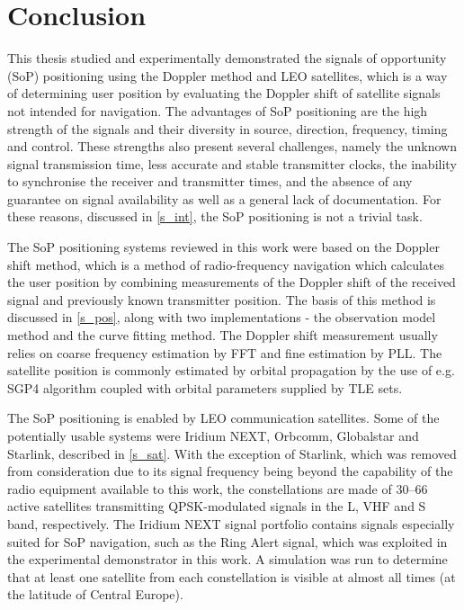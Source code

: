 \chapter{Conclusion}
\label{s_con}

This thesis studied and experimentally demonstrated the signals of opportunity (SoP) positioning using the Doppler method and LEO satellites, which is a way of determining user position by evaluating the Doppler shift of satellite signals not intended for navigation. The advantages of SoP positioning are the high strength of the signals and their diversity in source, direction, frequency, timing and control. These strengths also present several challenges, namely the unknown signal transmission time, less accurate and stable transmitter clocks, the inability to synchronise the receiver and transmitter times, and the absence of any guarantee on signal availability as well as a general lack of documentation. For these reasons, discussed in \autoref{s_int}, the SoP positioning is not a trivial task.

The SoP positioning systems reviewed in this work were based on the Doppler shift method, which is a method of radio-frequency navigation which calculates the user position by combining measurements of the Doppler shift of the received signal and previously known transmitter position. The basis of this method is discussed in \autoref{s_pos}, along with two implementations - the observation model method and the curve fitting method. The Doppler shift measurement usually relies on coarse frequency estimation by FFT and fine estimation by PLL. The satellite position is commonly estimated by orbital propagation by the use of e.g. SGP4 algorithm coupled with orbital parameters supplied by TLE sets.

The SoP positioning is enabled by LEO communication satellites. Some of the potentially usable systems were Iridium NEXT, Orbcomm, Globalstar and Starlink, described in \autoref{s_sat}. With the exception of Starlink, which was removed from consideration due to its signal frequency being beyond the capability of the radio equipment available to this work, the constellations are made of \numrange{30}{66} active satellites transmitting QPSK-modulated signals in the L, VHF and S band, respectively. The Iridium NEXT signal portfolio contains signals especially suited for SoP navigation, such as the Ring Alert signal, which was exploited in the experimental demonstrator in this work. A simulation was run to determine that at least one satellite from each constellation is visible at almost all times (at the latitude of Central Europe).

